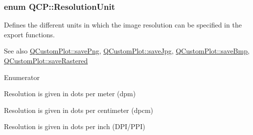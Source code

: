 \subsubsection[{\texorpdfstring{Resolution\+Unit}{ResolutionUnit}}]{\setlength{\rightskip}{0pt plus 5cm}enum {\bf Q\+C\+P\+::\+Resolution\+Unit}}\hypertarget{namespaceQCP_a715d46153da230990aa887d0f0602452}{}\label{namespaceQCP_a715d46153da230990aa887d0f0602452}
Defines the different units in which the image resolution can be specified in the export functions.

\begin{DoxySeeAlso}{See also}
\hyperlink{classQCustomPlot_ac92cc9256d12f354b40a4be4600b5fb9}{Q\+Custom\+Plot\+::save\+Png}, \hyperlink{classQCustomPlot_a76f0d278e630a711fa6f48048cfd83e4}{Q\+Custom\+Plot\+::save\+Jpg}, \hyperlink{classQCustomPlot_ae3a86ed0795670e50afa21759d4fa13d}{Q\+Custom\+Plot\+::save\+Bmp}, \hyperlink{classQCustomPlot_ad7723ce2edfa270632ef42b03a444352}{Q\+Custom\+Plot\+::save\+Rastered} 
\end{DoxySeeAlso}
\begin{Desc}
\item[Enumerator]\par
\begin{description}
\item[{\em 
ru\+Dots\+Per\+Meter\hypertarget{namespaceQCP_a715d46153da230990aa887d0f0602452a707d005dea5c4ab694e4270d9c6094e8}{}\label{namespaceQCP_a715d46153da230990aa887d0f0602452a707d005dea5c4ab694e4270d9c6094e8}
}]Resolution is given in dots per meter (dpm) \item[{\em 
ru\+Dots\+Per\+Centimeter\hypertarget{namespaceQCP_a715d46153da230990aa887d0f0602452a4224e01f49b331489ad8cb12b619b229}{}\label{namespaceQCP_a715d46153da230990aa887d0f0602452a4224e01f49b331489ad8cb12b619b229}
}]Resolution is given in dots per centimeter (dpcm) \item[{\em 
ru\+Dots\+Per\+Inch\hypertarget{namespaceQCP_a715d46153da230990aa887d0f0602452affb887d8efe79c39a1aca2acd7002afc}{}\label{namespaceQCP_a715d46153da230990aa887d0f0602452affb887d8efe79c39a1aca2acd7002afc}
}]Resolution is given in dots per inch (D\+P\+I/\+P\+PI) \end{description}
\end{Desc}
